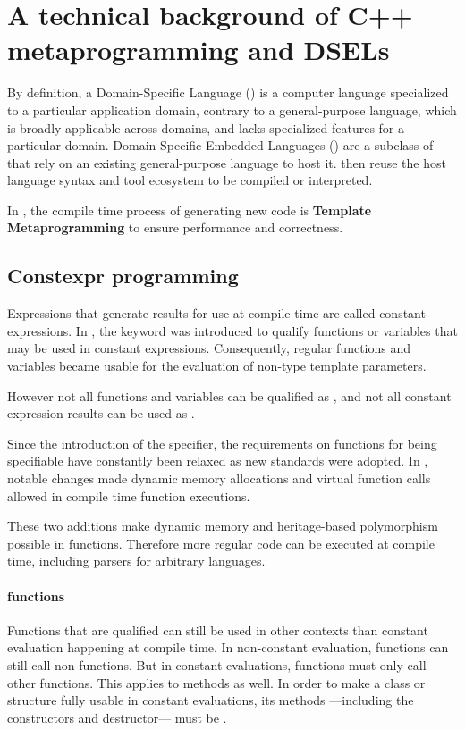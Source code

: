 \documentclass[../main]{subfiles}
\begin{document}

\section{
  A technical background of C++ metaprogramming and DSELs
}

By definition, a Domain-Specific Language (\dsl) is a computer language
specialized to a particular application domain, contrary to a general-purpose
language, which is broadly applicable across domains, and lacks specialized
features for a particular domain. Domain Specific Embedded Languages (\dsels)
are a subclass of \dsl that rely on an existing general-purpose language to host
it. \dsels then reuse the host language syntax and tool ecosystem to be compiled
or interpreted.

In \cpp, the compile time process of generating new code is
\textbf{Template Metaprogramming} to ensure performance and correctness.

\subsection{
  Constexpr programming
}
\label{lbl:constexpr-programming}

Expressions that generate results for use at compile time are called
constant expressions. In , the \constexpr keyword was introduced
to qualify functions or variables that may be used in constant expressions.
Consequently, regular functions and variables became usable for the evaluation
of non-type template parameters.

However not all functions and variables can be qualified as \constexpr,
and not all constant expression results can be used as \nttps.

Since the introduction of the \constexpr specifier, the requirements on
functions for being \constexpr specifiable have constantly been relaxed as new
\cpp standards were adopted. In , notable changes made dynamic memory
allocations\cite{constexpr-memory} and virtual \constexpr function
calls\cite{virtual-constexpr} allowed in compile time \constexpr function
executions.

These two additions make dynamic memory and heritage-based polymorphism
possible in \constexpr functions. Therefore more regular \cpp code can be
executed at compile time, including parsers for arbitrary languages.

\paragraph{\constexpr functions} Functions that are \constexpr qualified can
still be used in other contexts than constant evaluation happening at
compile time. In non-constant evaluation, \constexpr functions can still call
non-\constexpr functions. But in constant evaluations, \constexpr functions must
only call other \constexpr functions. This applies to methods as well.
In order to make a \cpp class or structure fully usable in constant evaluations,
its methods ---including the constructors and destructor--- must be \constexpr.
\end{document}
